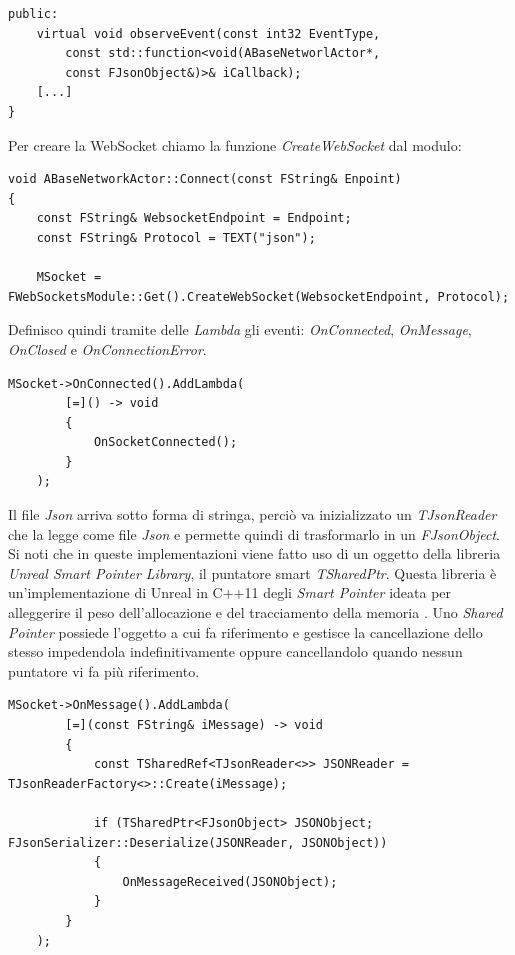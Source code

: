 \begin{lstlisting}[firstnumber=11, caption = Sezione del file header di BaseNetworkActor dove viene definita la funzione che esegue il put nella mappa degli eventi]
public:
    virtual void observeEvent(const int32 EventType,
        const std::function<void(ABaseNetworlActor*, 
        const FJsonObject&)>& iCallback);
    [...]  
}
\end{lstlisting}

Per creare la WebSocket chiamo la funzione \textit{CreateWebSocket} dal modulo:

\begin{lstlisting}[caption = Sezione del file source di ABaseNetworkActor dove viene creata la WebSocket]
void ABaseNetworkActor::Connect(const FString& Enpoint)
{
    const FString& WebsocketEndpoint = Endpoint;
    const FString& Protocol = TEXT("json");

	MSocket = FWebSocketsModule::Get().CreateWebSocket(WebsocketEndpoint, Protocol);
\end{lstlisting}

%
%
Definisco quindi tramite delle \textit{Lambda} gli eventi: \textit{OnConnected}, \textit{OnMessage}, \textit{OnClosed} e \textit{OnConnectionError}.

\begin{lstlisting}[firstnumber=7]
    MSocket->OnConnected().AddLambda(
		[=]() -> void
		{
			OnSocketConnected();
		}
	);
\end{lstlisting}

Il file \textit{Json} arriva sotto forma di stringa, perciò va inizializzato un \textit{TJsonReader} che la legge come file \textit{Json} e permette quindi di trasformarlo in un \textit{FJsonObject}.
%
Si noti che in queste implementazioni viene fatto uso di un oggetto della libreria \textit{Unreal Smart Pointer Library}, il puntatore smart \textit{TSharedPtr}.
%
Questa libreria è un'implementazione di Unreal in C++11 degli \textit{Smart Pointer} ideata per alleggerire il peso dell'allocazione e del tracciamento della memoria \cite{USmartPointerLibrary}.
%
Uno \textit{Shared Pointer} possiede l'oggetto a cui fa riferimento e gestisce la cancellazione dello stesso impedendola indefinitivamente oppure cancellandolo quando nessun puntatore vi fa più riferimento.

\begin{lstlisting}[firstnumber=13, caption=La funzione che gestisce i messaggi in entrata alla WebSocket]
	MSocket->OnMessage().AddLambda(
		[=](const FString& iMessage) -> void
		{
			const TSharedRef<TJsonReader<>> JSONReader = TJsonReaderFactory<>::Create(iMessage);

			if (TSharedPtr<FJsonObject> JSONObject; FJsonSerializer::Deserialize(JSONReader, JSONObject))
			{
				OnMessageReceived(JSONObject);
			}
		}
	);
\end{lstlisting}

